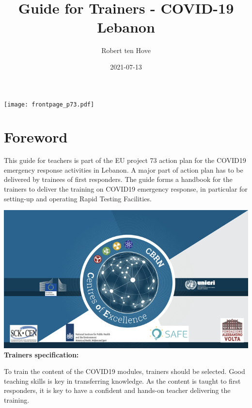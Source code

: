 \documentclass[
]{book}
\title{Guide for Trainers - COVID-19 Lebanon}
\author{Robert ten Hove}
\date{2021-07-13}
\let\oldmaketitle\maketitle
\begin{document}
\maketitle

\thispagestyle{empty}
\begin{center}
\texttt{[image: frontpage\_p73.pdf]}
\end{center}

\let\maketitle\oldmaketitle
\maketitle

{
\setcounter{tocdepth}{1}
\tableofcontents
}
\hypertarget{foreword}{%
\chapter{Foreword}\label{foreword}}

This guide for teachers is part of the EU project 73 action plan for the
COVID19 emergency response activities in Lebanon. A major part of action
plan has to be delivered by trainees of first responders. The guide
forms a handbook for the trainers to deliver the training on COVID19
emergency response, in particular for setting-up and operating Rapid Testing Facilities.

\includegraphics{images/CoE.jpeg}\\
\textbf{Trainers specification:}

To train the content of the COVID19 modules, trainers should be
selected. Good teaching skills is key in transferring knowledge. As the
content is taught to first responders, it is key to have a confident and
hands-on teacher delivering the training.
\end{document}
